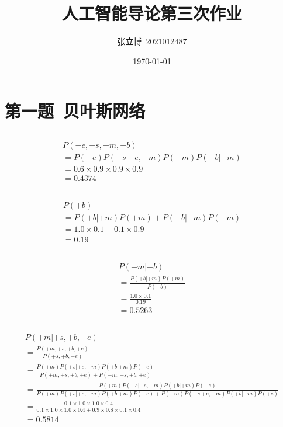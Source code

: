 \documentclass[12pt,a4paper]{article}
\title{\textbf{人工智能导论第三次作业}}
\author{张立博\ 2021012487}
\date{\today}
\begin{document}
\maketitle
\section{第一题\ 贝叶斯网络}
\subsection{}
\begin{gather*}
    P(-e,-s,-m,-b)\\
    =P(-e)P(-s|-e,-m)P(-m)P(-b|-m)\\
    =0.6\times0.9\times0.9\times0.9\\
    =0.4374
\end{gather*}
\subsection{}
\begin{gather*}
    P(+b)\\
    =P(+b|+m)P(+m)+P(+b|-m)P(-m)\\
    =1.0\times0.1+0.1\times0.9\\
    =0.19
\end{gather*}
\subsection{}
\begin{gather*}
    P(+m|+b)\\
    =\frac{P(+b|+m)P(+m)}{P(+b)}\\
    =\frac{1.0\times0.1}{0.19}\\
    =0.5263
\end{gather*}
\subsection{}
\begin{gather*}
    P(+m|+s,+b,+e)\\
    =\frac{P(+m,+s,+b,+e)}{P(+s,+b,+e)}\\
    =\frac{P(+m)P(+s|+e,+m)P(+b|+m)P(+e)}{P(+m,+s,+b,+e) + P(-m,+s,+b,+e)}\\
    =\frac{P(+m)P(+s|+e,+m)P(+b|+m)P(+e)}{P(+m)P(+s|+e,+m)P(+b|+m)P(+e) + P(-m)P(+s|+e,-m)P(+b|-m)P(+e)}\\
    =\frac{0.1\times1.0\times1.0\times0.4}{0.1\times1.0\times1.0\times0.4 + 0.9\times0.8\times0.1\times0.4}\\
    =0.5814
\end{gather*}
\end{document}
